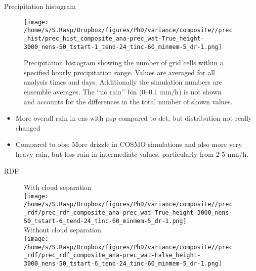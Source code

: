 \documentclass[a4paper, 12pt]{article}
\begin{document}
\newpage
Precipitation histogram
\begin{figure}[h!]
\noindent \centering
\texttt{[image: /home/s/S.Rasp/Dropbox/figures/PhD/variance/composite//prec\_hist/prec\_hist\_composite\_ana-prec\_wat-True\_height-3000\_nens-50\_tstart-1\_tend-24\_tinc-60\_minmem-5\_dr-1.png]}\\
\caption{Precipitation histogram showing the number of grid cells within a specified hourly precipitation range. Values are averaged for all analysis times and days. Additionally the simulation numbers are ensemble averages. The ``no rain'' bin (0--0.1 mm/h) is not shown and accounts for the differences in the total number of shown values.} \label{fig:prec_hist}
\end{figure}
\begin{itemize}
 \item More overall rain in ens with psp compared to det, but distribution not really changed
 \item Compared to obs: More drizzle in COSMO simulations and also more very heavy rain, but less rain in intermediate values, particularly from 2-5 mm/h. 
\end{itemize}


\newpage
RDF
\begin{figure}[h!]
\noindent \centering
With cloud separation\\
\texttt{[image: /home/s/S.Rasp/Dropbox/figures/PhD/variance/composite//prec\_rdf/prec\_rdf\_composite\_ana-prec\_wat-True\_height-3000\_nens-50\_tstart-6\_tend-24\_tinc-60\_minmem-5\_dr-1.png]}\\
Without cloud separation\\
\texttt{[image: /home/s/S.Rasp/Dropbox/figures/PhD/variance/composite//prec\_rdf/prec\_rdf\_composite\_ana-prec\_wat-False\_height-3000\_nens-50\_tstart-6\_tend-24\_tinc-60\_minmem-5\_dr-1.png]}\\
\end{figure}
\end{document}
